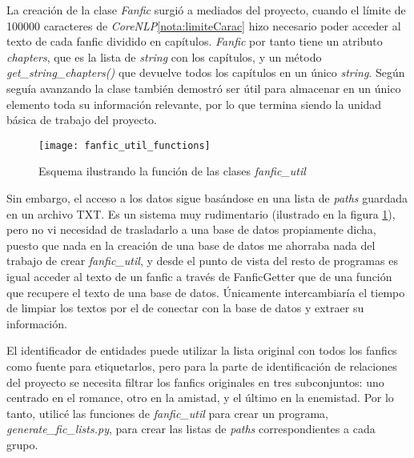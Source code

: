 \documentclass{pre-tfg}
\begin{document}
La creación de la clase \textit{Fanfic} surgió a mediados del proyecto, cuando el límite de 100000 caracteres de \textit{CoreNLP}\ref{nota:limiteCarac} hizo necesario poder acceder al texto de cada fanfic dividido en capítulos. \textit{Fanfic} por tanto tiene un atributo \textit{chapters}, que es la lista de \textit{string} con los capítulos, y un método \textit{get\_string\_chapters()} que devuelve todos los capítulos en un único \textit{string}. Según seguía avanzando la clase también demostró ser útil para almacenar en un único elemento toda su información relevante, por lo que termina siendo la unidad básica de trabajo del proyecto.

\begin{figure}[h]
	\centering
	\texttt{[image: fanfic\_util\_functions]}
	\caption{Esquema ilustrando la función de las clases \textit{fanfic\_util}}
	\label{fig:fanfic_util}
\end{figure}

Sin embargo, el acceso a los datos sigue basándose en una lista de \textit{paths} guardada en un archivo TXT. Es un sistema muy rudimentario (ilustrado en la figura \ref{fig:fanfic_util}), pero no vi necesidad de trasladarlo a una base de datos propiamente dicha, puesto que nada en la creación de una base de datos me ahorraba nada del trabajo de crear \textit{fanfic\_util}, y desde el punto de vista del resto de programas es igual acceder al texto de un fanfic a través de FanficGetter que de una función que recupere el texto de una base de datos. Únicamente intercambiaría el tiempo de limpiar los textos por el de conectar con la base de datos y extraer su información.

El identificador de entidades puede utilizar la lista original con todos los fanfics como fuente para etiquetarlos, pero para la parte de identificación de relaciones del proyecto se necesita filtrar los fanfics originales en tres subconjuntos: uno centrado en el romance, otro en la amistad, y el último en la enemistad. Por lo tanto, utilicé las funciones de \textit{fanfic\_util} para crear un programa, \textit{generate\_fic\_lists.py}, para crear las listas de \textit{paths} correspondientes a cada grupo.
\end{document}
